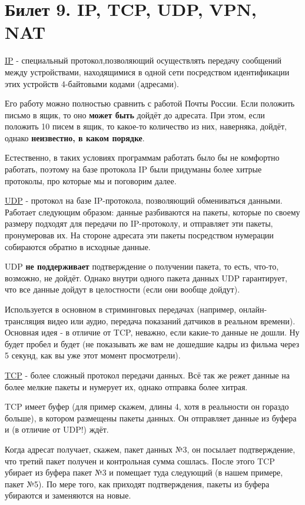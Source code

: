 \newpage
\section {Билет 9. IP, TCP, UDP, VPN, NAT}

\href{https://ru.wikipedia.org/wiki/IP}{IP} - специальный протокол,позволяющий осуществлять передачу сообщений между устройствами, находящимися в одной сети посредством идентификации этих устройств 4-байтовыми кодами (адресами).

Его работу можно полностью сравнить с работой Почты России. Если положить письмо в ящик, то оно \textbf{может быть} дойдёт до адресата. При этом, если положить 10 писем в ящик, то какое-то количество из них, наверняка, дойдёт, однако \textbf{неизвестно, в каком порядке}.

Естественно, в таких условиях программам работать было бы не комфортно работать, поэтому на базе протокола IP были придуманы более хитрые протоколы, про которые мы и поговорим далее.

\bigskip
\href{https://ru.wikipedia.org/wiki/UDP}{UDP} - протокол на базе IP-протокола, позволяющий обмениваться данными. Работает следующим образом: данные разбиваются на пакеты, которые по своему размеру подходят для передачи по IP-протоколу, и отправляет эти пакеты, пронумеровав их. На стороне адресата эти пакеты посредством нумерации собираются обратно в исходные данные.

UDP \textbf{не поддерживает} подтверждение о получении пакета, то есть, что-то, возможно, не дойдёт. Однако внутри одного пакета данных UDP гарантирует, что все данные дойдут в целостности (если они вообще дойдут).

Используется в основном в стриминговых передачах (например, онлайн-трансляция видео или аудио, передача показаний датчиков в реальном времени). Основная идея - в отличие от TCP, неважно, если какие-то данные не дошли. Ну будет пробел и будет (не показывать же вам не дошедшие кадры из фильма через 5 секунд, как вы уже этот момент просмотрели).

\bigskip
\href{https://ru.wikipedia.org/wiki/Transmission_Control_Protocol}{TCP} - более сложный протокол передачи данных. Всё так же режет данные на более мелкие пакеты и нумерует их, однако отправка более хитрая.

TCP имеет буфер (для пример скажем, длины 4, хотя в реальности он гораздо больше), в котором размещены пакеты данных. Он отправляет данные из буфера и (в отличие от UDP!) ждёт.

Когда адресат получает, скажем, пакет данных №3, он посылает подтверждение, что третий пакет получен и контрольная сумма сошлась. После этого TCP убирает из буфера пакет №3 и помещает туда следующий (в нашем примере, пакет №5). По мере того, как приходят подтверждения, пакеты из буфера убираются и заменяются на новые.

